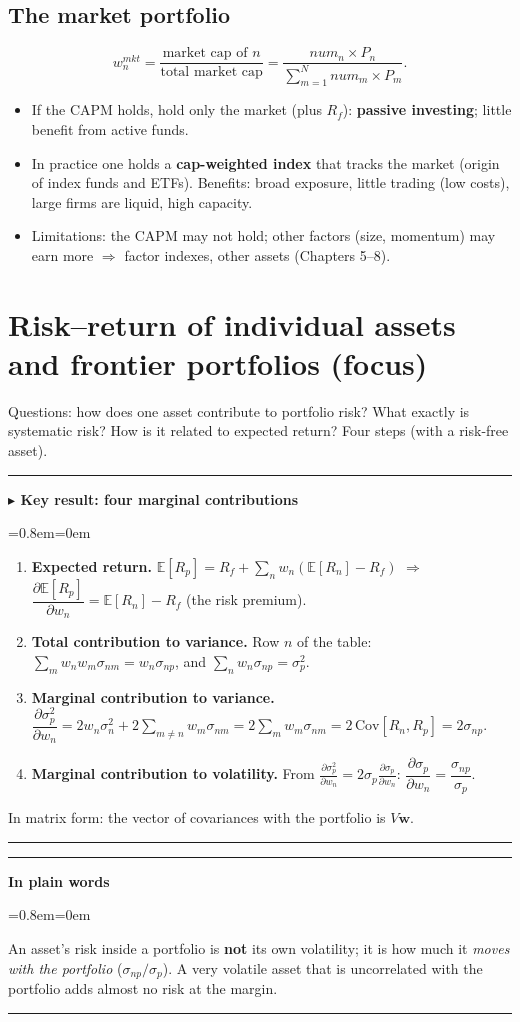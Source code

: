 \documentclass[11pt,a4paper]{report}
\newenvironment{notebox}[1]
  {\par\medskip\Needspace{6\baselineskip}\noindent\rule{\linewidth}{0.4pt}\par\nopagebreak
   \noindent\textbf{#1}\par\nopagebreak
   \begin{list}{}{\leftmargin=0.8em\rightmargin=0em\topsep=2pt}\item[]}
  {\end{list}\nopagebreak\noindent\rule{\linewidth}{0.4pt}\par\medskip}
\newenvironment{keybox}[1][]{\begin{notebox}{$\blacktriangleright$ Key result#1}}{\end{notebox}}
\newenvironment{plainbox}{\begin{notebox}{In plain words}}{\end{notebox}}
\newcommand{\E}{\mathbb{E}}
\newcommand{\w}{\bm{w}}
\begin{document}
\subsection{The market portfolio}
\[
w_n^{mkt}=\frac{\text{market cap of }n}{\text{total market cap}}=\frac{num_n\times P_n}{\sum_{m=1}^N num_m\times P_m}.
\]
\begin{itemize}
  \item If the CAPM holds, hold only the market (plus $R_f$): \textbf{passive investing};
    little benefit from active funds.
  \item In practice one holds a \textbf{cap-weighted index} that tracks the market
    (origin of index funds and ETFs). Benefits: broad exposure, little trading
    (low costs), large firms are liquid, high capacity.
  \item Limitations: the CAPM may not hold; other factors (size, momentum) may
    earn more $\Rightarrow$ factor indexes, other assets (Chapters 5--8).
\end{itemize}

\section{Risk--return of individual assets and frontier portfolios (focus)}
Questions: how does one asset contribute to portfolio risk? What exactly is
systematic risk? How is it related to expected return? Four steps (with a risk-free asset).

\begin{keybox}[: four marginal contributions]
\begin{enumerate}
  \item \textbf{Expected return.} $\E[R_p]=R_f+\sum_n w_n(\E[R_n]-R_f)$
    $\Rightarrow$ $\dfrac{\partial\E[R_p]}{\partial w_n}=\E[R_n]-R_f$ (the risk premium).
  \item \textbf{Total contribution to variance.} Row $n$ of the table:
    $\sum_m w_nw_m\sigma_{nm}=w_n\sigma_{np}$, and $\sum_n w_n\sigma_{np}=\sigma_p^2$.
  \item \textbf{Marginal contribution to variance.}
    $\dfrac{\partial\sigma_p^2}{\partial w_n}=2w_n\sigma_n^2+2\sum_{m\ne n}w_m\sigma_{nm}=2\sum_m w_m\sigma_{nm}=2\,\text{Cov}[R_n,R_p]=2\sigma_{np}$.
  \item \textbf{Marginal contribution to volatility.} From $\frac{\partial\sigma_p^2}{\partial w_n}=2\sigma_p\frac{\partial\sigma_p}{\partial w_n}$:
    $\dfrac{\partial\sigma_p}{\partial w_n}=\dfrac{\sigma_{np}}{\sigma_p}$.
\end{enumerate}
In matrix form: the vector of covariances with the portfolio is $V\w$.
\end{keybox}
\begin{plainbox}
An asset's risk inside a portfolio is \textbf{not} its own volatility; it is how
much it \emph{moves with the portfolio} ($\sigma_{np}/\sigma_p$). A very volatile
asset that is uncorrelated with the portfolio adds almost no risk at the margin.
\end{plainbox}
\end{document}
